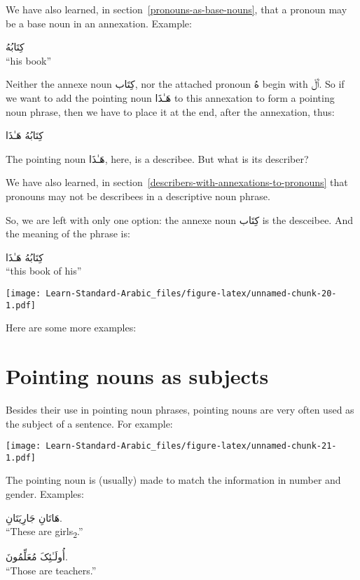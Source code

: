 \documentclass[
  10pt,
]{book}
\begin{document}
We have also learned, in
section~\ref{pronouns-as-base-nouns},
that a pronoun may be a base noun in an annexation.
Example:

\foreignlanguage{arabic}{کِتَابُهُ}\\
\enquote{his book}

Neither the annexe noun \foreignlanguage{arabic}{کِتَاب}, nor the attached pronoun \foreignlanguage{arabic}{هُ} begin with \foreignlanguage{arabic}{ٱَلْ}.
So if we want to add the pointing noun \foreignlanguage{arabic}{هَـٰذَا} to this annexation to form a pointing noun phrase,
then we have to place it at the end, after the annexation, thus:

\foreignlanguage{arabic}{کِتَابُهُ هَـٰذَا}

The pointing noun \foreignlanguage{arabic}{هَـٰذَا}, here, is a describee. But what is its describer?

We have also learned, in
section~\ref{describers-with-annexations-to-pronouns}
that pronouns may not be describees in a descriptive noun phrase.

So, we are left with only one option: the annexe noun \foreignlanguage{arabic}{کِتَاب} is the desceibee. And the meaning of the phrase is:

\foreignlanguage{arabic}{کِتَابُهُ هَـٰذَا}\\
\enquote{this book of his}

\texttt{[image: Learn-Standard-Arabic\_files/figure-latex/unnamed-chunk-20-1.pdf]}

Here are some more examples:

\section{Pointing nouns as subjects}\label{pointing-nouns-as-subjects}

Besides their use in pointing noun phrases, pointing nouns are very often used as the subject of a sentence. For example:

\texttt{[image: Learn-Standard-Arabic\_files/figure-latex/unnamed-chunk-21-1.pdf]}

The pointing noun is (usually) made to match the information in number and gender. Examples:

\foreignlanguage{arabic}{هَاتَانِ جَارِيَتَانِ.}\\
\enquote{These are girls\textsubscript{2}.}

\foreignlanguage{arabic}{أُولَـٰئِکَ مُعَلِّمُونَ.}\\
\enquote{Those are teachers.}
\end{document}
